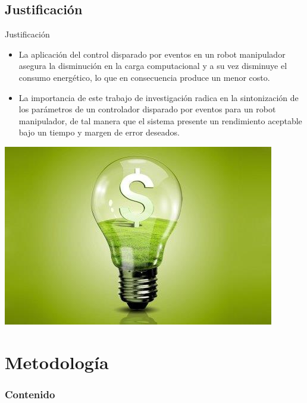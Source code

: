{{{\subsection{Justificación}
\begin{frame}[shrink=20]{Justificación}
\begin{block}{}
	\justifying
	\begin{itemize}
		\justifying
		\item La aplicación del control disparado por eventos en un robot manipulador asegura la disminución en la carga computacional y a su vez disminuye el consumo energético, lo que en consecuencia produce un menor costo.
		\item La importancia de este trabajo de investigación radica en la sintonización de los parámetros de un controlador disparado por eventos para un robot manipulador, de tal manera que el sistema presente un rendimiento aceptable bajo un tiempo y margen de error deseados.
	\end{itemize}
\end{block} 
	\vspace{0.2cm}
	\centering
	\includegraphics[scale=0.4]{Introduccion/costo-energ.jpg}
\end{frame}

\section{Metodología}{
	\begin{frame}
		\frametitle{Contenido}
	\end{frame}
}}}}
